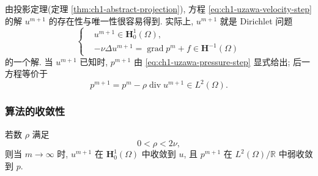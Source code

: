 由投影定理(定理 \ref{thm:ch1-abstract-projection}), 方程 \eqref{eq:ch1-uzawa-velocity-step} 的解 $u^{m+1}$ 的存在性与唯一性很容易得到. 实际上, $u^{m+1}$ 就是 Dirichlet 问题
\begin{equation}
\left\{
\begin{aligned}
&u^{m+1}\in\mathbf H_0^1(\Omega),\\
&-\nu\Delta u^{m+1}=\operatorname{grad}p^m+f\in\mathbf H^{-1}(\Omega)
\end{aligned}
\right.
\label{eq:ch1-uzawa-dirichlet-step}
\end{equation}
的一个解. 当 $u^{m+1}$ 已知时, $p^{m+1}$ 由 \eqref{eq:ch1-uzawa-pressure-step} 显式给出; 后一方程等价于
\begin{equation}
p^{m+1}=p^m-\rho\operatorname{div}u^{m+1}\in L^2(\Omega).
\label{eq:ch1-uzawa-pressure-update}
\end{equation}

\subsubsection*{算法的收敛性}

\begin{Theorem}
\label{thm:ch1-uzawa-convergence}
若数 $\rho$ 满足
\begin{equation}
0<\rho<2\nu,
\label{eq:ch1-uzawa-step-condition}
\end{equation}
则当 $m\to\infty$ 时, $u^{m+1}$ 在 $\mathbf H_0^1(\Omega)$ 中收敛到 $u$, 且 $p^{m+1}$ 在 $L^2(\Omega)/\mathbb R$ 中弱收敛到 $p$.
\end{Theorem}

